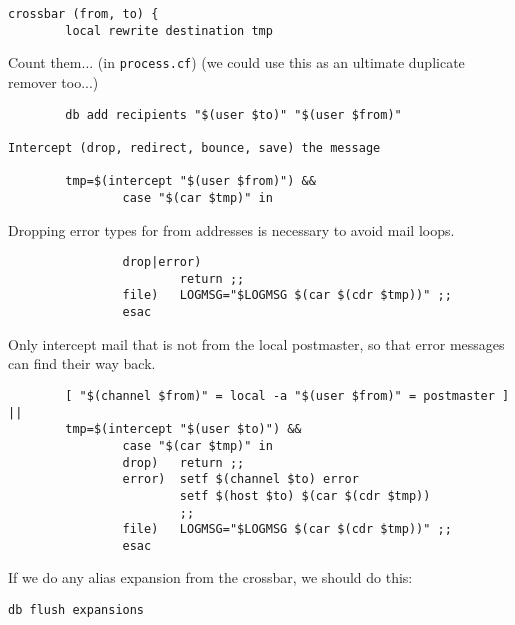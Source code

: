 \begin{verbatim}
crossbar (from, to) {
        local rewrite destination tmp
\end{verbatim}


Count them...  (in {\tt process.cf})
(we could use this as an ultimate duplicate remover too...)

\begin{verbatim}
        db add recipients "$(user $to)" "$(user $from)"

Intercept (drop, redirect, bounce, save) the message

        tmp=$(intercept "$(user $from)") &&
                case "$(car $tmp)" in
\end{verbatim}

Dropping error types for from addresses is necessary to avoid mail loops.
\begin{verbatim}
                drop|error)
                        return ;;
                file)   LOGMSG="$LOGMSG $(car $(cdr $tmp))" ;;
                esac
\end{verbatim}


Only intercept mail that is not from the local postmaster,
so that error messages can find their way back.

\begin{verbatim}
        [ "$(channel $from)" = local -a "$(user $from)" = postmaster ] ||
        tmp=$(intercept "$(user $to)") &&
                case "$(car $tmp)" in
                drop)   return ;;
                error)  setf $(channel $to) error
                        setf $(host $to) $(car $(cdr $tmp))
                        ;;
                file)   LOGMSG="$LOGMSG $(car $(cdr $tmp))" ;;
                esac
\end{verbatim}

If we do any alias expansion from the crossbar, we should do this:
\begin{verbatim}
db flush expansions
\end{verbatim}

